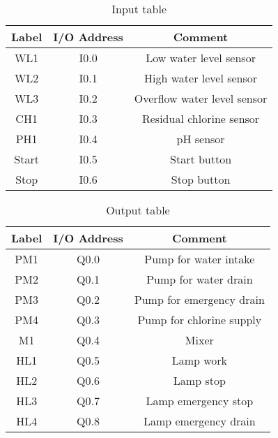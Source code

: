 \begin{table}[]
    \centering
    \begin{tabular}{|c|c|c|}
    \hline
       Label & I/O Address & Comment \\
       \hline
       WL1 & I0.0 & Low water level sensor\\
       \hline
       WL2 & I0.1 & High water level sensor\\
       \hline
       WL3 & I0.2 & Overflow water level sensor\\
       \hline
       CH1 & I0.3 & Residual chlorine sensor\\
       \hline
       PH1 & I0.4 & pH sensor\\
       \hline
       Start & I0.5 & Start button\\
       \hline
       Stop & I0.6 & Stop button\\
       \hline
    \end{tabular}
    \caption{Input table}
    \label{tab:input_table}
\end{table}

\begin{table}[]
    \centering
    \begin{tabular}{|c|c|c|}
    \hline
       Label & I/O Address & Comment \\
       \hline
       PM1 & Q0.0 & Pump for water intake\\
       \hline
       PM2 & Q0.1 & Pump for water drain\\
       \hline
       PM3 & Q0.2 & Pump for emergency drain\\
       \hline
       PM4 & Q0.3 & Pump for chlorine supply\\
       \hline
       M1 & Q0.4 & Mixer\\
       \hline
       HL1 & Q0.5 & Lamp work\\
       \hline
       HL2 & Q0.6 & Lamp stop\\
       \hline
       HL3 & Q0.7 & Lamp emergency stop\\
       \hline
       HL4 & Q0.8 & Lamp emergency drain\\
       \hline
    \end{tabular}
    \caption{Output table}
    \label{tab:output_label}
\end{table}

